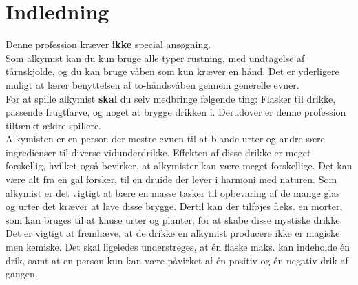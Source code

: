 
\chapter*{Indledning}

Denne profession kræver \textbf{ikke} special ansøgning.\\
Som alkymist kan du kun bruge alle typer rustning, med undtagelse af tårnskjolde, og du kan bruge våben som kun kræver en hånd. Det er yderligere muligt at lærer benyttelsen af to-håndsvåben gennem generelle evner.\\

For at spille alkymist \textbf{skal} du selv medbringe følgende ting: Flasker til drikke, passende frugtfarve, og noget at brygge drikken i. Derudover er denne profession tiltænkt ældre spillere.\\

Alkymisten er en person der mestre evnen til at blande urter og andre sære ingredienser til diverse vidunderdrikke. Effekten af disse drikke er meget forskellig, hvilket også bevirker, at alkymister kan være meget forskellige. Det kan være alt fra en gal forsker, til en druide der lever i harmoni med naturen.
Som alkymist er det vigtigt at bære en masse tasker til opbevaring af de mange glas og urter det kræver at lave disse brygge. Dertil kan der tilføjes f.eks. en morter, som kan bruges til at knuse urter og planter, for at skabe disse mystiske drikke.\\
Det er vigtigt at fremhæve, at de drikke en alkymist producere ikke er magiske men kemiske. Det skal ligeledes understreges, at én flaske maks. kan indeholde én drik, samt at en person kun kan være påvirket af én positiv og én negativ drik af gangen.\\